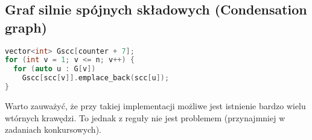 \documentclass[../main.tex]{subfiles}
\begin{document}
\subsection{Graf silnie spójnych składowych (Condensation graph)}

\begin{frame}[fragile]{\subsecname}

\begin{block}{}
\begin{lstlisting}[language = C++]
vector<int> Gscc[counter + 7];
for (int v = 1; v <= n; v++) {
  for (auto u : G[v])
    Gscc[scc[v]].emplace_back(scc[u]);
}
\end{lstlisting}
\end{block}
\pause
Warto zauważyć, że przy takiej implementacji możliwe jest istnienie bardzo wielu wtórnych krawędzi.
To jednak z reguły nie jest problemem (przynajmniej w zadaniach konkursowych).

\end{frame}
\end{document}

